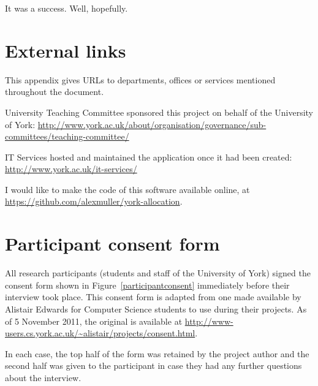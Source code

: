 \documentclass[]{scrartcl}
\begin{document}

It was a success. Well, hopefully.

\appendix


\newpage
\section{External links}

This appendix gives URLs to departments, offices or services mentioned
throughout the document.

University Teaching Committee sponsored this project on behalf of the
University of York:
\url{http://www.york.ac.uk/about/organisation/governance/sub-committees/teaching-committee/}

IT Services hosted and maintained the application once it had been created:
\url{http://www.york.ac.uk/it-services/}

I would like to make the code of this software available online, at
\url{https://github.com/alexmuller/york-allocation}.

\newpage
\section{Participant consent form}
\label{sec:consent}

All research participants (students and staff of the University of York)
signed the consent form shown in Figure~\ref{participantconsent} immediately
before their interview took place. This consent form is adapted from one made
available by Alistair Edwards for Computer Science students to use during
their projects. As of 5 November 2011, the original is available at
\url{http://www-users.cs.york.ac.uk/~alistair/projects/consent.html}.

In each case, the top half of the form was retained by the project author and
the second half was given to the participant in case they had any further
questions about the interview.
\end{document}
